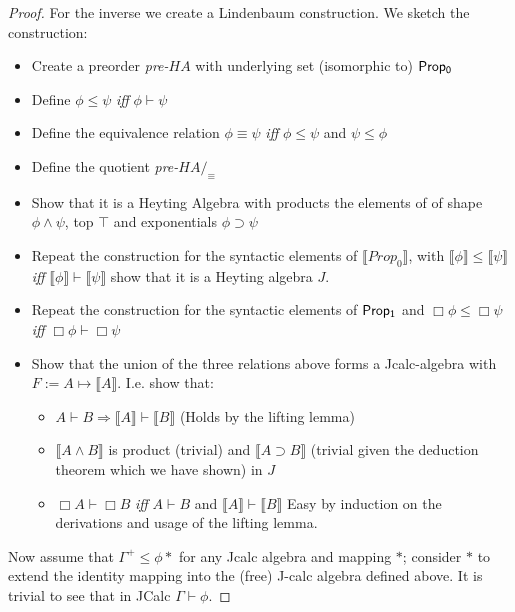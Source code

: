 \begin{proof}
    For the inverse we create a Lindenbaum construction. We sketch the construction:
    \begin{itemize}
        \item Create a preorder \textit{pre-}$HA$ with underlying set (isomorphic to) ${\sf Prop_0}$
        \item Define $\phi\le\psi$ {\textit{iff}} $\phi\vdash\psi$
        \item Define the equivalence relation $\phi\equiv\psi$ {\textit{iff}} 
        $\phi\le\psi$ and $\psi\le\phi$
        \item Define the quotient \textit{pre-}$HA/_{\equiv}$
        \item Show that it is a Heyting Algebra with products the elements of
        of shape $\phi\wedge\psi$, top $\top$ and exponentials $\phi\supset\psi$
        \item Repeat the construction for the syntactic elements of 
        $\llbracket Prop_0 \rrbracket$, with 
        $\llbracket\phi\rrbracket\le\llbracket\psi\rrbracket$ 
        \textit{iff} $\llbracket\phi\rrbracket\vdash\llbracket\psi\rrbracket$
        show that it is a Heyting algebra $J$.
        \item Repeat the construction for the syntactic elements of
         ${\sf Prop_1}$ and $\Box \phi\le\Box\psi$ \textit{iff} $\Box\phi\vdash\Box\psi$
        \item Show that the union of the three relations above forms a 
        Jcalc-algebra with $F:= A\mapsto \llbracket A\rrbracket$. I.e. show that:
        \begin{itemize}
            \item $A\vdash B\Rightarrow \llbracket A\rrbracket\vdash \llbracket B\rrbracket$
            (Holds by the lifting lemma)
            \item $\llbracket A\wedge B\rrbracket $ is product (trivial) and 
            $\llbracket A\supset B \rrbracket$ (trivial given the deduction theorem which we have shown)
            in $J$
            \item $\Box A\vdash\Box B$ \textit{iff} $A\vdash B$ and $\llbracket A\rrbracket \vdash \llbracket B\rrbracket$
            Easy by induction on the derivations and usage of the lifting lemma.
        \end{itemize}
    \end{itemize}
    Now assume that $\Gamma^{+}\le\phi*$ for any Jcalc algebra and 
    mapping $*$; consider  $*$ to extend  the identity mapping  
    into the (free) J-calc algebra defined above. It is trivial to see that in JCalc
    $\Gamma\vdash\phi$.
\end{proof}

